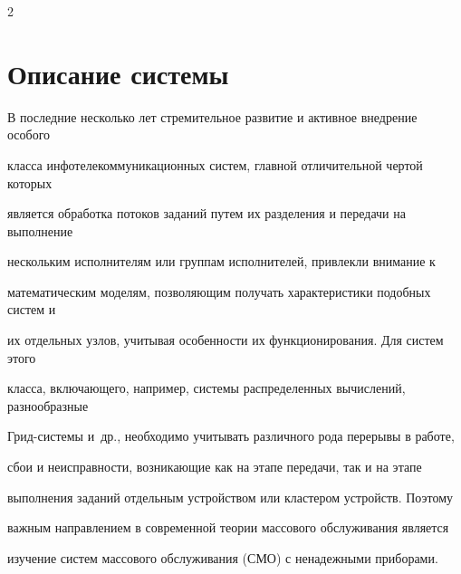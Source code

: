 









\begin{multicols}{2}








\label{st\stat}








\section{Описание системы}





В последние несколько лет стремительное развитие и активное внедрение особого 


класса инфотелекоммуникационных систем, главной отличительной чертой которых 


является обработка потоков заданий путем их разделения и передачи на выполнение 


нескольким исполнителям или группам исполнителей, привлекли внимание к 


математическим моделям, позволяющим получать характеристики подобных систем и 


их отдельных узлов, учитывая особенности их функционирования. Для систем этого 


класса, включающего, например, системы распределенных вычислений, разнообразные 


Грид-системы и~др., необходимо учитывать различного рода перерывы в работе, 


сбои и неисправности, возникающие как на этапе передачи, так и на этапе 


выполнения заданий отдельным устройством или кластером устройств. Поэтому 


важным направлением в современной теории массового обслуживания является 


изучение систем массового обслуживания (СМО) с ненадежными приборами. 






\end{multicols}
